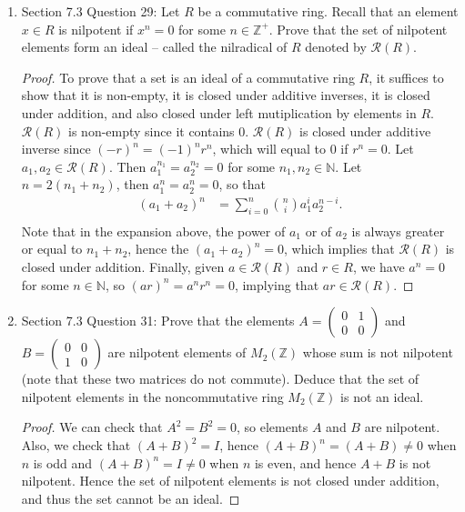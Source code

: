 \documentclass{article}
\begin{document}
\begin{enumerate}[label={\bf Q\arabic*:}]
  \item Section 7.3 Question 29: Let $R$ be a commutative ring. Recall that
    an element $x\in R$ is nilpotent if $x^n=0$ for some
    $n\in\mathbb{Z}^+$. Prove that the set of nilpotent elements form an
    ideal -- called the nilradical of $R$ denoted by $\mathcal{R}(R)$.

    \begin{proof}
      To prove that a set is an ideal of a commutative ring $R$, it
      suffices to show that it is non-empty, it is closed under additive
      inverses, it is closed under addition, and also closed under
      left mutiplication by elements in $R$. $\mathcal{R}(R)$ is non-empty
      since it contains 0. $\mathcal{R}(R)$ is closed under additive
      inverse since $(-r)^n=(-1)^nr^n$, which will equal to 0 if $r^n=0$.
      Let $a_1,a_2\in\mathcal{R}(R)$. Then $a_1^{n_1}=a_2^{n_2}=0$ for some
      $n_1,n_2\in\mathbb{N}$. Let $n=2(n_1+n_2)$, then $a_1^{n}=a_2^{n}=0$,
      so that
      \begin{align*}
        (a_1+a_2)^n &= \sum_{i=0}^n\binom{n}{i}a_1^ia_2^{n-i}. \\
      \end{align*}
      Note that in the expansion above, the power of $a_1$ or of $a_2$ is
      always greater or equal to $n_1+n_2$, hence the $(a_1+a_2)^n=0$,
      which implies that $\mathcal{R}(R)$ is closed under addition.
      Finally, given $a\in\mathcal{R}(R)$ and $r\in R$, we have $a^n=0$ for
      some $n\in\mathbb{N}$, so $(ar)^n=a^nr^n=0$, implying that
      $ar\in\mathcal{R}(R)$.
    \end{proof}

  \item Section 7.3 Question 31: Prove that the elements
    $A=\begin{pmatrix}0&1\\0&0\end{pmatrix}$ and
    $B=\begin{pmatrix}0&0\\1&0\end{pmatrix}$ are nilpotent elements of
    $M_2(\mathbb{Z})$ whose sum is not nilpotent (note that these two
    matrices do not commute). Deduce that the set of nilpotent elements in
    the noncommutative ring $M_2(\mathbb{Z})$ is not an ideal.

    \begin{proof}
      We can check that $A^2=B^2=0$, so elements $A$ and $B$ are nilpotent.
      Also, we check that $(A+B)^2=I$, hence $(A+B)^n=(A+B)\neq0$ when $n$
      is odd and $(A+B)^n=I\neq0$ when $n$ is even, and hence $A+B$ is not
      nilpotent. Hence the set of nilpotent elements is not closed under
      addition, and thus the set cannot be an ideal.
    \end{proof}


\end{enumerate}
\end{document}
